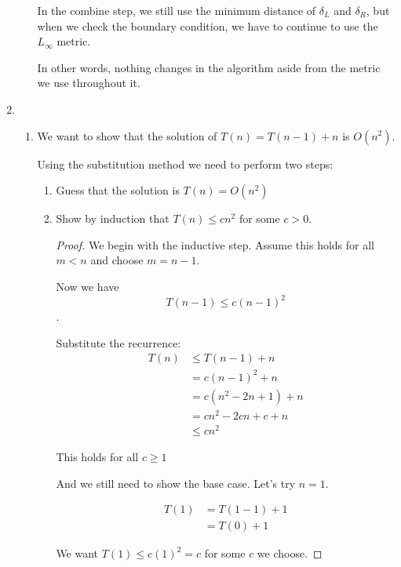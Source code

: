 \documentclass[12pt,letterpaper]{article}
\begin{document}
\begin{enumerate}
\begin{enumerate}
          In the combine step, we still use the minimum distance of $\delta_L$ and $\delta_R$, but when we check the boundary condition, we have to continue to use the $L_{\infty}$ metric.

          In other words, nothing changes in the algorithm aside from the metric we use throughout it.
      \end{enumerate}

    \item
      \begin{enumerate}
        \item
          We want to show that the solution of $T(n) = T(n-1) + n$ is $O(n^2)$.

          Using the substitution method we need to perform two steps:
          \begin{enumerate}
            \item Guess that the solution is $T(n) = O(n^2)$
            \item Show by induction that $T(n) \le cn^2$ for some $c > 0$.

              \begin{proof} We begin with the inductive step.
                Assume this holds for all $m < n$ and choose $m = n - 1$.

                Now we have
                \[T(n-1) \le c(n-1)^2\].

                Substitute the recurrence:
                \begin{align*}
                  T(n) &\le T(n-1) + n \\
                  &= c(n-1)^2 + n \\
                  &= c(n^2-2n+1) + n \\
                  &= cn^2 - 2cn + c + n \\
                  &\le cn^2
                \end{align*}

                This holds for all $c \ge 1$

                And we still need to show the base case.
                Let's try $n = 1$.

                \begin{align*}
                  T(1) &= T(1 - 1) + 1 \\
                  &= T(0) + 1
                \end{align*}

                We want $T(1) \le c(1)^2 = c$ for some $c$ we choose.


\end{proof}
\end{enumerate}
\end{enumerate}
\end{enumerate}
\end{document}
